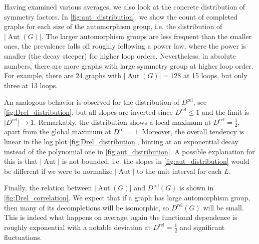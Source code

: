 \documentclass[12pt,a4paper]{article}
\newcommand{\abs}[1]{\lvert #1 \rvert}
\newcommand{\Aut}{\operatorname{Aut}}
\renewcommand{\|}{\rule[-0.4ex]{0.2ex}{1.2em}}
\begin{document}
Having examined various averages, we also look at the concrete distribution of symmetry factors.
In \cref{fig:aut_distribution}, we show the count of completed graphs for each size of the automorphism group, i.e. the distribution of $\abs{\Aut(G)}$. The larger automorphism groups are less frequent than the smaller ones, the prevalence falls off roughly following a power law, where the power is smaller (the decay steeper) for higher loop orders. Nevertheless, in absolute numbers, there are more graphs with large symmetry group at higher loop order. For example, there are 24 graphs with $\abs{\Aut(G)}=128$ at 15 loops, but only three at 13 loops.

An analogous behavior is observed for the distribution of $D^\text{rel}$, see \cref{fig:Drel_distribution}, but all slopes are inverted since $D^\text{rel} \leq 1$ and the limit is $\abs{D^\text{rel}} \rightarrow 1$. Remarkably, the distribution shows a local maximum at $D^\text{rel}=\frac 12$, apart from the global maximum at $D^\text{rel}=1$. Moreover, the overall tendency is linear in the log plot \cref{fig:Drel_distribution}, hinting at an exponential decay instead of the polynomial one in \cref{fig:aut_distribution}. A possible explanation for this is that $\abs{\Aut}$ is not bounded, i.e. the slopes in \cref{fig:aut_distribution} would be different if we were to normalize $\abs{\Aut}$ to the unit interval for each $L$.

Finally, the relation between $\abs{\Aut(G)}$ and $D^\text{rel}(G)$ is shown in \cref{fig:Drel_correlation}. We expect that if a graph has large automorphism group, then many of its decompletions will be isomorphic, so $D^\text{rel}(G)$ will be small. This is indeed what happens on average, again the functional dependence is roughly exponential with a notable deviation at $D^\text{rel}=\frac 12$ and significant fluctuations.
\end{document}
